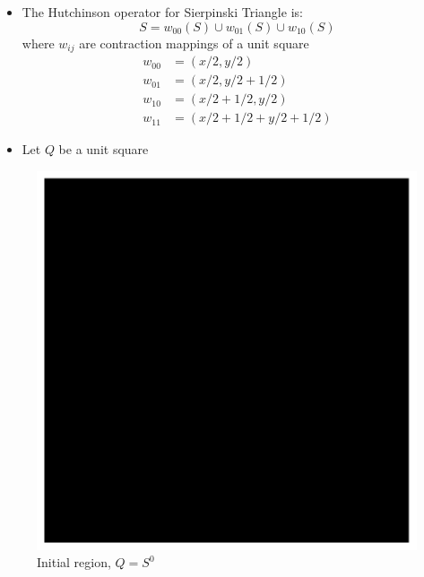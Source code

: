 \documentclass{beamer}
\begin{document}
\begin{frame}
    \begin{itemize}
    \item The Hutchinson operator for Sierpinski Triangle is:
    \begin{equation*}
        S = w_{00}(S) \cup w_{01}(S) \cup w_{10}(S)
    \end{equation*}
    where $w_{ij}$ are contraction mappings of a unit square
    \begin{align*}
        w_{00} &= (x/2,y/2)\\
        w_{01} &= (x/2, y/2+1/2) \\
        w_{10} &= (x/2 + 1/2, y/2) \\
        w_{11} &= (x/2 + 1/2 + y/2 + 1/2)
    \end{align*}
    \item Let $Q$ be a unit square  
    \end{itemize}
\end{frame}

\begin{frame}
    \begin{figure}
        \centering
        \includegraphics[scale=0.5]{0.pdf}
        \caption{Initial region, $Q = S^0$}
    \end{figure}
\end{frame}
\end{document}
